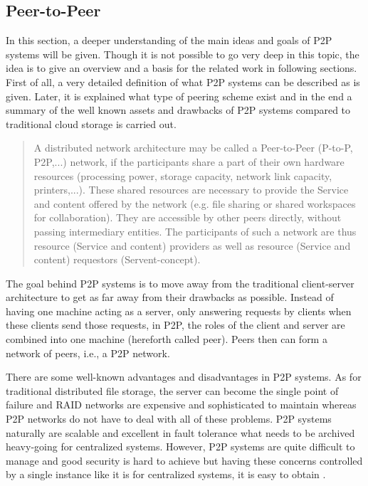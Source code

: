 \subsection{Peer-to-Peer}
In this section, a deeper understanding of the main ideas and goals of P2P systems will be given. Though it is not possible to go very deep in this topic, the idea is to give an overview and a basis for the related work in following sections. First of all, a very detailed definition of what P2P systems can be described as is given. Later, it is explained what type of peering scheme exist and in the end a summary of the well known assets and drawbacks of P2P systems compared to traditional cloud storage is carried out.
\begin{quote}
A distributed network architecture may be called a Peer-to-Peer (P-to-P, P2P,...) network, if the participants share a part of their own hardware resources (processing power, storage capacity, network link capacity, printers,...). These shared resources are necessary to provide the Service and content offered by the network (e.g. file sharing or shared workspaces for collaboration). They are accessible by other peers directly, without passing intermediary entities. The participants of such a network are thus resource (Service and content) providers as well as resource (Service and content) requestors (Servent-concept)\cite{p2p:definition}.
\end{quote}
The goal behind P2P systems is to move away from the traditional client-server architecture to get as far away from their drawbacks as possible. Instead of having one machine acting as a server, only answering requests by clients when these clients send those requests, in P2P, the roles of the client and server are combined into one machine (hereforth called peer). Peers then can form a network of peers, i.e., a P2P network.

There are some well-known advantages and disadvantages in P2P systems. As for traditional distributed file storage, the server can become the single point of failure and RAID networks are expensive and sophisticated to maintain whereas P2P networks do not have to deal with all of these problems. P2P systems naturally are scalable and excellent in fault tolerance what needs to be archived heavy-going for centralized systems. However, P2P systems are quite difficult to manage and good security is hard to achieve but having these concerns controlled by a single instance like it is for centralized systems, it is easy to obtain \cite{tomp2p:p2p_introduction}.

